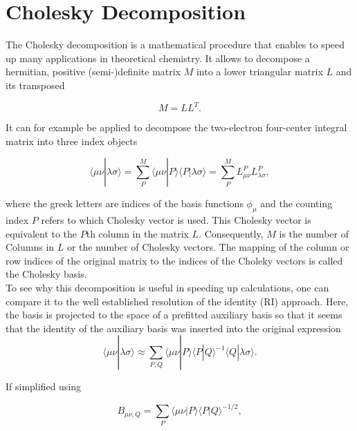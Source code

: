 \section{Cholesky Decomposition}

The Cholesky decomposition is a mathematical procedure that enables to speed up many applications in theoretical chemistry. It allows to decompose a hermitian, positive (semi-)definite matrix $M$ into a lower triangular matrix $L$ and its transposed

\begin{equation}
M=LL^T.
\end{equation}

It can for example be applied to decompose the two-electron four-center integral matrix  into three index objects

\begin{equation}\label{CDMatrix}
\langle \mu \nu | \lambda \sigma \rangle = \sum_P^M \langle \mu \nu | P \rangle \langle P | \lambda \sigma \rangle = \sum_P^M L^P_{\mu\nu} L^P_{\lambda\sigma} ,
\end{equation}

where the greek letters are indices of the basis functions $\phi_\mu$ and the counting index $P$ refers to which Cholesky vector is used. This Cholesky vector is equivalent to the $P$th column in the matrix $L$. Consequently, $M$ is the number of Columns in $L$ or the number of Cholesky vectors. The mapping of the column or row indices of the original matrix to the indices of the Choleky vectors is called the Cholesky basis.\\

To see why this decomposition is useful in speeding up calculations, one can compare it to the well established resolution of the identity (RI) approach. Here, the basis is projected to the space of a prefitted auxiliary basis so that it seems that the identity of the auxiliary basis was inserted into the original expression
\begin{equation}\label{RIFull}
\langle \mu \nu | \lambda \sigma \rangle \approx \sum_{P,Q} \langle \mu \nu | P \rangle \langle P | Q \rangle^{-1} \langle Q | \lambda \sigma \rangle .
\end{equation} 

If simplified using

\begin{equation}
B_{\mu \nu,Q} = \sum_{P} \langle \mu \nu | P \rangle \langle P | Q \rangle^{-1/2},
\end{equation}


